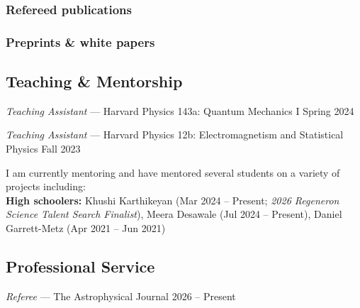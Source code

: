 \documentclass[12pt,letterpaper]{article}
\begin{document}
  \subsubsection{Refereed publications}
  \begin{list}{}{\cvlist}
    
  \end{list}

  \subsubsection{Preprints \& white papers}
  \begin{list}{}{\cvlist}
    
  \end{list}
\fi

\subsection{Teaching \& Mentorship}
\begin{list}{}{\cvlist}
      \item \textit{Teaching Assistant} --- Harvard Physics 143a: Quantum Mechanics I \hfill \textcolor{niceblue}{Spring 2024}
      \item \textit{Teaching Assistant} --- Harvard Physics 12b: Electromagnetism and Statistical Physics \hfill \textcolor{niceblue}{Fall 2023}
\end{list}

I am currently mentoring and have mentored several students on a variety of projects including: \\
\textbf{High schoolers:} Khushi Karthikeyan (Mar 2024 -- Present; \textit{2026 Regeneron Science Talent Search Finalist}), Meera Desawale (Jul 2024 -- Present), Daniel Garrett-Metz (Apr 2021 -- Jun 2021)

\subsection{Professional Service}
\begin{list}{}{\cvlist}
      \item \textit{Referee} --- The Astrophysical Journal \hfill \textcolor{niceblue}{2026 -- Present}
\end{list}
\end{document}
